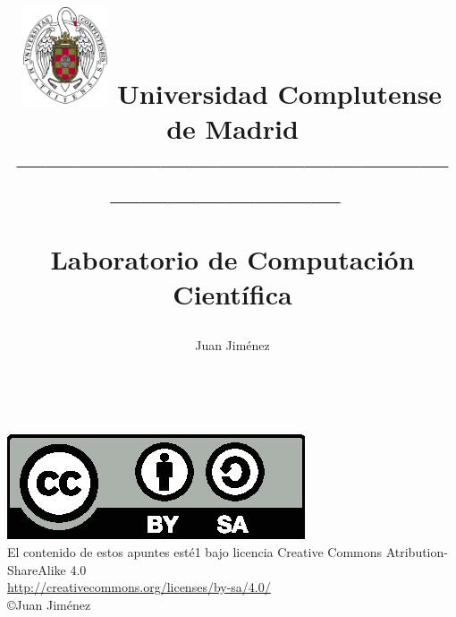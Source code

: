 \documentclass[a4paper,10pt]{book}
\begin{document}
\title{
\begin{flushleft}
\includegraphics[width=2.5cm]{ucm2.pdf}
Universidad Complutense de Madrid\\
---------------------------------------------------------------------\
\end{flushleft}
Laboratorio de Computaci\'on Cient\'ifica}
\author{ Juan Jim\'enez}
\maketitle\
\
\vspace*{\fill}

\includegraphics[scale=1]{by-sa.eps}\\
El contenido de estos apuntes est\'e1 bajo licencia Creative Commons Atribution-ShareAlike 4.0\\
\href{http://creativecommons.org/licenses/by-sa/4.0/}{http://creativecommons.org/licenses/by-sa/4.0/}\\
\copyright Juan Jim\'enez

\bigskip
\tableofcontents
\listoffigures
\listoftables











\printindex
\end{document}
